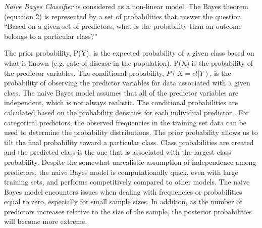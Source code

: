 
\emph{Naive Bayes Classifier} is considered as a non-linear model.
The Bayes theorem (equation 2) is represented by a set of probabilities 
that answer the question, ``Based on a given set of predictors, 
what is the probability than an outcome belongs to a particular class?''

The prior probability, P(Y), is the expected probability of a given class 
based on what is known (e.g. rate of disease in the population). P(X) 
is the probability of the predictor variables. The conditional probability,
$P(X=cl|Y)$, is the probability of observing the predictor variables for data 
associated with a given class. The naive Bayes model assumes that all of the 
predictor variables are independent, which is not always realistic. The 
conditional probabilities are calculated based on the probability densities 
for each individual predictor \cite{kuhn13}. For categorical predictors, the 
observed frequencies in the training set data can be used to determine the 
probability distributions. The prior probability allows us to tilt the final 
probability toward a particular class. Class probabilities are created and 
the predicted class is the one that is associated with the largest class
probability. Despite the somewhat unrealistic assumption of independence among
predictors, the naive Bayes model is computationally quick, even with large 
training sets, and performs competitively compared to other models. The naive 
Bayes model encounters issues when dealing with frequencies or probabilities 
equal to zero, especially for small sample sizes. In addition, as the number 
of predictors increases relative to the size of the sample, the posterior 
probabilities will become more extreme.


